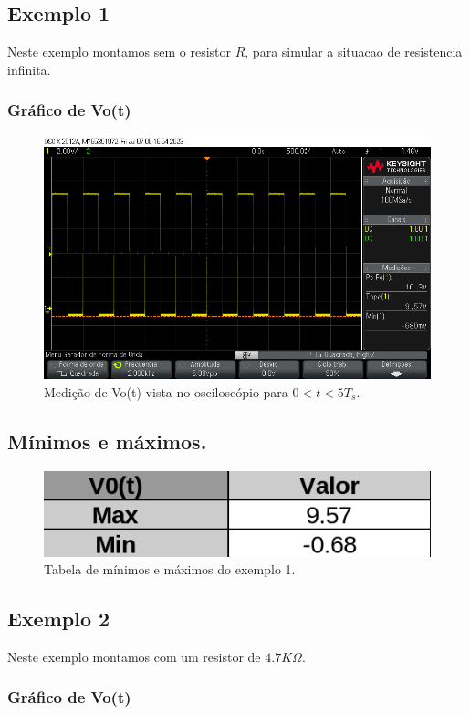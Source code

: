 \subsection{Exemplo 1}

Neste exemplo montamos sem o resistor $R$, para simular a situacao de resistencia infinita.

\subsubsection{Gráfico de Vo(t)}

\begin{figure}[H]
    \label{fig:ex1}
    \centering
    \includegraphics[width=0.7\columnwidth]{images/exemplo1.png}
    \caption{Medição de Vo(t) vista no osciloscópio para $0 < t < 5 T_s$.}
\end{figure}

\subsection{Mínimos e máximos.}

\begin{figure}[H]
    \label{fig:minmax_ex1}
    \centering
    \includegraphics[width=0.5\columnwidth]{images/minmax_ex1.png}
    \caption{Tabela de mínimos e máximos do exemplo 1.}
\end{figure}

\subsection{Exemplo 2}

Neste exemplo montamos com um resistor  de $4.7K \Omega$.

\subsubsection{Gráfico de Vo(t)}

